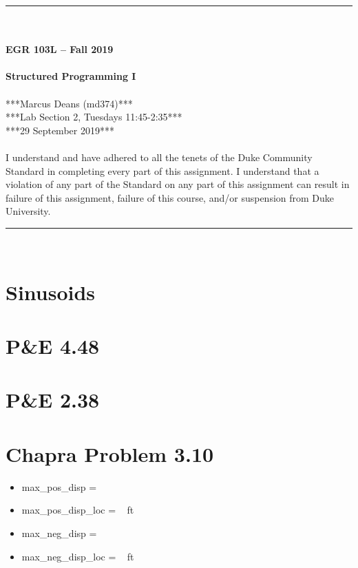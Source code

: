 \documentclass{article}
\begin{document}
\begin{center}
\rule{6.5in}{0.5mm}\\~\\
\textbf{\large EGR 103L -- Fall 2019}\\~\\
\textbf{\huge Structured Programming I}\\~\\
***Marcus Deans (md374)***\\
***Lab Section 2, Tuesdays 11:45-2:35***\\
***29 September 2019***\\~\\
{\small I understand and have adhered to all the tenets of the Duke
  Community Standard in completing every part of this assignment.  I
  understand that a violation of any part of the Standard on any part
  of this assignment can result in failure of this assignment, failure
  of this course, and/or suspension from Duke University.} 
\rule{6.5in}{0.5mm}\\
\end{center}
\tableofcontents
\listoffigures
\pagebreak

\section{Sinusoids}

\section{P\&E 4.48}

\section{P\&E 2.38}

\section{Chapra Problem 3.10}
\begin{itemize}
\item max\_pos\_disp = ~
\item max\_pos\_disp\_loc = ~ ft
\item max\_neg\_disp = ~
\item max\_neg\_disp\_loc = ~ ft
\end{itemize}
\end{document}

